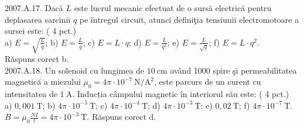 2007.A.17. Dacă $L$ este lucrul mecanic efectuat de o sursă electrică pentru deplasarea sarcinii $q$ pe întregul circuit, atunci definiţia tensiunii electromotoare a sursei este: ( 4 pct.)\\ a) $E=\sqrt{\frac{L}{q}}$; b) $E=\frac{L}{q}$; c) $E=L \cdot q$; d) $E=\frac{L}{q^{2}}$; e) $E=\frac{L}{\sqrt{q}}$; f) $E=L \cdot q^{2}$.\\ Răspuns corect b.\\

2007.A.18. Un solenoid cu lungimea de $10 \mathrm{~cm}$ având 1000 spire şi permeabilitatea magnetică a miezului $\mu_{0}=4 \pi \cdot 10^{-7} \mathrm{~N} / \mathrm{A}^{2}$, este parcurs de un curent cu intensitatea de $1 \mathrm{~A}$. Inducția câmpului magnetic în interiorul său este: ( 4 pct.)\\ a) $0,001 \mathrm{~T}$; b) $4 \pi \cdot 10^{-5} \mathrm{~T}$; c) $4 \pi \cdot 10^{-4} \mathrm{~T}$; d) $4 \pi \cdot 10^{-3} \mathrm{~T}$; e) $0,02 \mathrm{~T}$; f) $4 \pi \cdot 10^{-7} \mathrm{~T}$.\\ $B=\mu_{0} \frac{N I}{l}=4 \pi \cdot 10^{-3} \mathrm{~T}$. Răspuns corect d.\\
